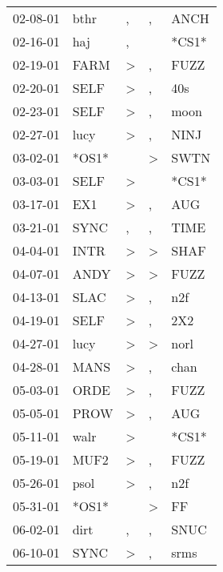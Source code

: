 \begin{supertabular}{lllll}
 02-08-01 &   bthr &                , &                , &   ANCH \\
 02-16-01 &    haj &                , &                  &  *CS1* \\
 02-19-01 &   FARM &     \textgreater &                , &   FUZZ \\
 02-20-01 &   SELF &     \textgreater &                , &    40s \\
 02-23-01 &   SELF &     \textgreater &                , &   moon \\
 02-27-01 &   lucy &     \textgreater &                , &   NINJ \\
 03-02-01 &  *OS1* &                  &     \textgreater &   SWTN \\
 03-03-01 &   SELF &     \textgreater &                  &  *CS1* \\
 03-17-01 &    EX1 &     \textgreater &                , &    AUG \\
 03-21-01 &   SYNC &                , &                , &   TIME \\
 04-04-01 &   INTR &     \textgreater &     \textgreater &   SHAF \\
 04-07-01 &   ANDY &     \textgreater &     \textgreater &   FUZZ \\
 04-13-01 &   SLAC &     \textgreater &                , &    n2f \\
 04-19-01 &   SELF &     \textgreater &                , &    2X2 \\
 04-27-01 &   lucy &     \textgreater &     \textgreater &   norl \\
 04-28-01 &   MANS &     \textgreater &                , &   chan \\
 05-03-01 &   ORDE &     \textgreater &                , &   FUZZ \\
 05-05-01 &   PROW &     \textgreater &                , &    AUG \\
 05-11-01 &   walr &     \textgreater &                  &  *CS1* \\
 05-19-01 &   MUF2 &     \textgreater &                , &   FUZZ \\
 05-26-01 &   psol &     \textgreater &                , &    n2f \\
 05-31-01 &  *OS1* &                  &     \textgreater &     FF \\
 06-02-01 &   dirt &                , &                , &   SNUC \\
 06-10-01 &   SYNC &     \textgreater &                , &   srms \\

\end{supertabular}
